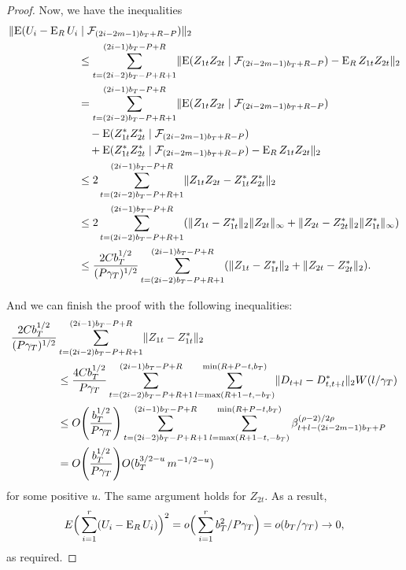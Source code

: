 \documentclass[11pt]{article}
\begin{document}
\begin{proof}
Now, we have the inequalities
\begin{align*}
  \lVert \operatorname{E}( U_i - \operatorname{E}_R U_i & \mid \mathcal{F}_{(2i-2m-1)b_{T}+R-P}) \rVert_2
  \\ &\leq
  \sum_{t=(2i-2)b_T-P+R+1}^{(2i-1)b_T-P+R} \lVert \operatorname{E}(Z_{1t}Z_{2t} \mid \mathcal{F}_{(2i-2m-1)b_{T}+R-P}) - \operatorname{E}_R
  Z_{1t}Z_{2t} \rVert_2 \\
  &= \sum_{t=(2i-2)b_T-P+R+1}^{(2i-1)b_T-P+R} \lVert \operatorname{E}(Z_{1t}Z_{2t} \mid \mathcal{F}_{(2i-2m-1)b_{T}+R-P}) \\
  &\quad - \operatorname{E}(Z_{1t}^* Z_{2t}^* \mid \mathcal{F}_{(2i-2m-1)b_{T}+R-P}) \\
  &\quad + \operatorname{E}(Z_{1t}^* Z_{2t}^* \mid \mathcal{F}_{(2i-2m-1)b_{T}+R-P})
  - \operatorname{E}_R Z_{1t}Z_{2t} \rVert_2 \\
  &\leq 2 \sum_{t=(2i-2)b_T-P+R+1}^{(2i-1)b_T-P+R} \lVert Z_{1t} Z_{2t} - Z_{1t}^* Z_{2t}^*
  \rVert_2 \\
  &\leq 2 \sum_{t=(2i-2)b_T-P+R+1}^{(2i-1)b_T-P+R} (\lVert Z_{1t} - Z_{1t}^* \rVert_2 \lVert
  Z_{2t} \rVert_{\infty}
  + \lVert Z_{2t} - Z_{2t}^* \rVert_2 \lVert Z_{1t}^* \rVert_{\infty}) \\
  &\leq \frac{2 C b_T^{1/2}}{(P\gamma_T)^{1/2}} \sum_{t=(2i-2)b_T-P+R+1}^{(2i-1)b_T-P+R} (\lVert Z_{1t} - Z_{1t}^* \rVert_2
  + \lVert Z_{2t} - Z_{2t}^* \rVert_2).
\end{align*}

And we can finish the proof with the following inequalities:
\begin{align*}
  \frac{2 C b_T^{1/2}}{(P \gamma_T)^{1/2}} &\sum_{t=(2i-2)b_T-P+R+1}^{(2i-1)b_T-P+R} \lVert Z_{1t} - Z_{1t}^* \rVert_2 \\& \leq
  \frac{4C b_T^{1/2}}{P\gamma_T} \sum_{t=(2i-2)b_T-P+R+1}^{(2i-1)b_T-P+R} \sum_{l=\max(R+1-t,-b_T)}^{\min(R+P-t,b_T)} \lVert
  D_{t+l} - D_{t,t+l}^* \rVert_2 W(l/\gamma_T) \\&
  \leq O\Bigg(\frac{b_T^{1/2}}{P\gamma_T}\Bigg) \sum_{t=(2i-2)b_T-P+R+1}^{(2i-1)b_T-P+R}
  \sum_{l=\max(R+1-t,-b_T)}^{\min(R+P-t,b_T)} \beta^{(\rho-2)/2\rho}_{t+l-(2i-2m-1)b_T+P}\\&
  = O\Bigg(\frac{b_T^{1/2}}{P\gamma_T}\Bigg) O(b_T^{3/2-u}\, m^{-1/2-u})
\end{align*}
for some positive $u$.  The same argument holds for $Z_{2t}$.
As a result,
\[
E\Big(\sum_{i=1}^r (U_i - \operatorname{E}_R U_i)\Big)^2 = o\Big(\sum_{i=1}^r b_T^2/P\gamma_T\Big) =
 o(b_T/\gamma_T) \to 0,
\]
as required.
\end{proof}

\end{document}
